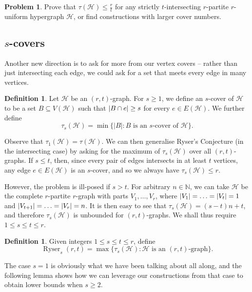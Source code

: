 \documentclass[a4paper,twoside,11pt]{article}
\DeclarePairedDelimiter{\card}{|}{|}
\numberwithin{thm}{section}
\theoremstyle{definition}
\newtheorem{dfn}[thm]{Definition}
\newtheorem{prob}{Problem}
\theoremstyle{remark}
\theoremstyle{definition}
\newcommand{\m}[1]{\mathcal{#1}}
\DeclareMathOperator{\Ryser}{Ryser}
\begin{document}
\begin{prob}
Prove that $\tau(\m H) \le \frac{r}{t}$ for any strictly $t$-intersecting $r$-partite $r$-uniform hypergraph $\m H$, or find constructions with larger cover numbers.
\end{prob}

\subsection{$s$-covers}
Another new direction is to ask for more from our vertex covers -- rather than just intersecting each edge, we could ask for a set that meets every edge in many vertices.

\begin{dfn}
Let $\m H$ be an $(r, t)$-graph.
For $s \geq 1$, we define an $s$-cover of $\m H$ to be a set $B \subseteq V(\m H)$ such that $\card{B \cap e} \ge s$ for every $e \in E(\m H)$.  We further define
\[\tau_s(\m H) = \min\{|B| : B \text{ is an } s\text{-cover of } \m H \}.\]
\end{dfn}

Observe that $\tau_1(\m H) = \tau(\m H)$. 
We can then generalise Ryser's Conjecture (in the intersecting case) by asking for the maximum of $\tau_s(\m H)$ over all $(r, t)$-graphs. If $s \le t$, then, since every pair of edges intersects in at least $t$ vertices, any edge $e \in E(\m H)$ is an $s$-cover, and so we always have $\tau_s(\m H) \le r$.

However, the problem is ill-posed if $s > t$.  For arbitrary $n \in \mathbb{N}$, we can take $\m H$ be the complete $r$-partite $r$-graph with parts $V_1, \hdots, V_r$, where $\card{V_1} = \hdots = \card{V_t} = 1$ and $\card{V_{t+1}} = \hdots =  \card{V_r} = n$.  It is then easy to see that $\tau_s(\m H) = (s-t)n + t$, and therefore $\tau_s(\m H)$ is unbounded for $(r,t)$-graphs. We shall thus require $1 \le s \le t \le r$.

\begin{dfn}
Given integers $1 \le s \le t \le r$, define
\[ \Ryser_s(r,t) = \max \{ \tau_s(\m H) : \m H \textrm{ is an } (r,t)\textrm{-graph} \}. \]
\end{dfn}

The case $s = 1$ is obviously what we have been talking about all along, and the following lemma shows how we can leverage our constructions from that case to obtain lower bounds when $s \ge 2$.
\end{document}
